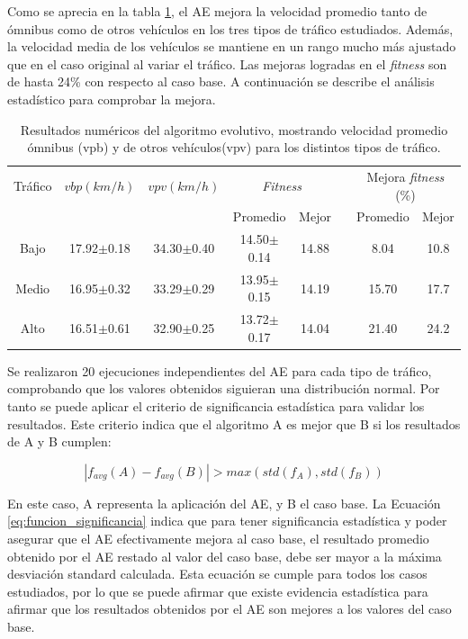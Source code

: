 Como se aprecia en la tabla \ref{table:resultado_caso_algoritmo}, el AE mejora la velocidad promedio tanto de ómnibus como de otros vehículos en los tres tipos de tráfico estudiados. Además, la velocidad media de los vehículos se mantiene en un rango mucho más ajustado que en el caso original al variar el tráfico. Las mejoras logradas en el \emph{fitness} son de hasta 24\% con respecto al caso base. A continuación se describe el análisis estadístico para comprobar la mejora.


\begin{table}[H]
	\renewcommand{\arraystretch}{1.2}	
		\centering
	\caption[Resultados numéricos del AE]{Resultados numéricos del algoritmo evolutivo, mostrando velocidad promedio ómnibus (vpb) y de otros vehículos(vpv) para los distintos tipos de tráfico. }
	\label{table:resultado_caso_algoritmo}
	\begin{tabular}{cccccccc}
		\hline 
		Tráfico& 
		$vbp(km/h)$& 
		$vpv(km/h)$&
		\multicolumn{2}{c}{\emph{Fitness}}&  & 
		\multicolumn{2}{c}{Mejora \emph{fitness} (\%)}\\  \cline{4-5} \cline{7-8}&     &     & \multicolumn{1}{c}{Promedio} & \multicolumn{1}{c}{Mejor} &  & \multicolumn{1}{c}{Promedio} & \multicolumn{1}{c}{Mejor} \\ \hline
		Bajo & 17.92$\pm$0.18 & 34.30$\pm$0.40 & 14.50$\pm$0.14 & 14.88 & & 8.04 & 10.8  \\
		Medio& 16.95$\pm$0.32 & 33.29$\pm$0.29 & 13.95$\pm$0.15 & 14.19 & & 15.70& 17.7\\ 
		Alto & 16.51$\pm$0.61  & 32.90$\pm$0.25& 13.72$\pm$0.17 & 14.04 & & 21.40& 24.2\\	
		\hline	    
	\end{tabular}
\end{table}

Se realizaron 20 ejecuciones independientes del AE para cada tipo de tráfico, comprobando que los valores obtenidos siguieran una distribución normal. Por tanto se puede aplicar el criterio de significancia estadística para validar los resultados. Este criterio indica que el
algoritmo A es mejor que B si los resultados de A y B cumplen:

\begin{equation}
\label{eq:funcion_significancia}
\left |f_{avg}(A) - f_{avg}(B)  \right | > max(std(f_A),std(f_B))
\end{equation}

En este caso, A representa la aplicación del AE, y B el caso base. La Ecuación \ref{eq:funcion_significancia} indica que para tener significancia estadística y poder asegurar que el AE efectivamente mejora al caso base, el resultado promedio obtenido por el AE restado al valor del caso base, debe ser mayor a la máxima desviación standard calculada. Esta ecuación se cumple para todos los casos estudiados, por lo que se puede afirmar que existe evidencia estadística para afirmar que los resultados obtenidos por el AE son mejores a los valores del caso base.

